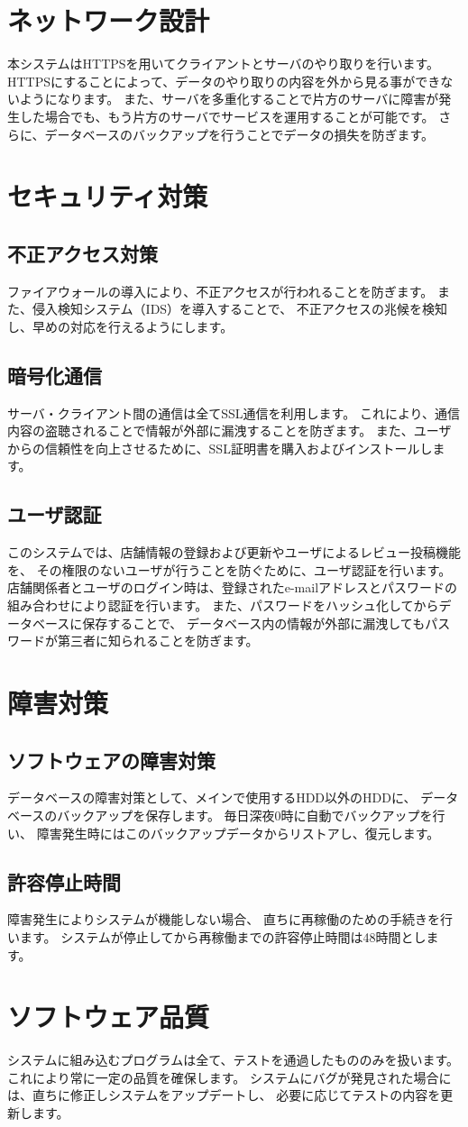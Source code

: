 \documentclass[a4j,titlepage]{jarticle}
\begin{document}
\section{ネットワーク設計}
本システムはHTTPSを用いてクライアントとサーバのやり取りを行います。
HTTPSにすることによって、データのやり取りの内容を外から見る事ができないようになります。
また、サーバを多重化することで片方のサーバに障害が発生した場合でも、もう片方のサーバでサービスを運用することが可能です。
さらに、データベースのバックアップを行うことでデータの損失を防ぎます。

\section{セキュリティ対策}
\subsection{不正アクセス対策}
ファイアウォールの導入により、不正アクセスが行われることを防ぎます。
また、侵入検知システム（IDS）を導入することで、
不正アクセスの兆候を検知し、早めの対応を行えるようにします。

\subsection{暗号化通信}
サーバ・クライアント間の通信は全てSSL通信を利用します。
これにより、通信内容の盗聴されることで情報が外部に漏洩することを防ぎます。
また、ユーザからの信頼性を向上させるために、SSL証明書を購入およびインストールします。

\subsection{ユーザ認証}
このシステムでは、店舗情報の登録および更新やユーザによるレビュー投稿機能を、
その権限のないユーザが行うことを防ぐために、ユーザ認証を行います。
店舗関係者とユーザのログイン時は、登録されたe-mailアドレスとパスワードの組み合わせにより認証を行います。
また、パスワードをハッシュ化してからデータベースに保存することで、
データベース内の情報が外部に漏洩してもパスワードが第三者に知られることを防ぎます。

\section{障害対策}
\subsection{ソフトウェアの障害対策}
データベースの障害対策として、メインで使用するHDD以外のHDDに、
データベースのバックアップを保存します。
毎日深夜0時に自動でバックアップを行い、
障害発生時にはこのバックアップデータからリストアし、復元します。

\subsection{許容停止時間}
障害発生によりシステムが機能しない場合、
直ちに再稼働のための手続きを行います。
システムが停止してから再稼働までの許容停止時間は48時間とします。

\section{ソフトウェア品質}
システムに組み込むプログラムは全て、テストを通過したもののみを扱います。
これにより常に一定の品質を確保します。
システムにバグが発見された場合には、直ちに修正しシステムをアップデートし、
必要に応じてテストの内容を更新します。
\end{document}
